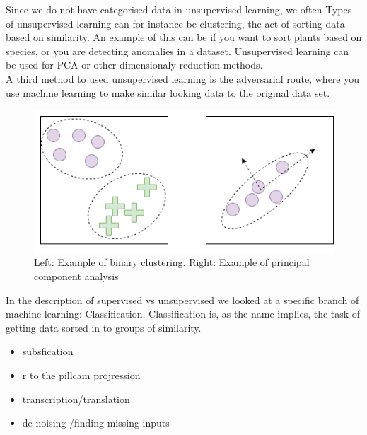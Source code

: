 	  Since we do not have categorised data in unsupervised learning, we often %
	  Types of unsupervised learning can for instance be clustering, the act of sorting data based on similarity. An example of this can be if you want to sort plants based on species, or 
	  you are detecting anomalies in a dataset.
	  Unsupervised learning can be used for PCA %
	  or other dimensionaly reduction methods.\\
	  
	  A third method to used unsupervised learning is the adversarial route, where you use machine learning to make similar looking data to the original data set. 
	    
	   \begin{figure}
	     \centering
	    \includegraphics[scale=0.5]{figures/cluster_pca.png}
	     \caption{Left: Example of binary clustering. Right: Example of principal component analysis} 
	  \end{figure}

	 
	  In the description of supervised vs unsupervised we looked at a specific branch of machine learning: Classification. Classification is, as the name implies, the task of 
	  getting data sorted in to groups of similarity. 
	  
	  
	  \begin{itemize}
	    \item subsfication
	    \item r to the pillcam projression 
	    \item transcription/translation
	    \item de-noising /finding missing inputs
	  \end{itemize}
	  
